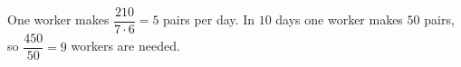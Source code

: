 One worker makes $\dfrac{210}{7\cdot6}=5$ pairs per day. In $10$ days one worker makes $50$ pairs, so $\dfrac{450}{50}=\boxed{9}$ workers are needed.
